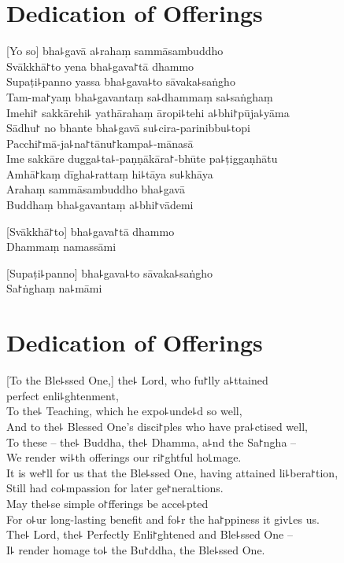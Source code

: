 
\chapter{Dedication of Offerings}%

[Yo so] bha꜕gavā a꜕rahaṃ sammāsambuddho\\
Svākkhā꜓to yena bha꜕gava꜓tā dhammo\\
Supaṭi꜕panno yassa bha꜕gava꜕to sāvaka꜕saṅgho\\
Tam-ma꜓yaṃ bha꜕gavantaṃ sa꜕dhammaṃ sa꜕saṅghaṃ\\
Imehi꜓ sakkārehi꜕ yathārahaṃ āropi꜕tehi a꜕bhi꜓pūja꜕yāma\\
Sādhu꜓ no bhante bha꜕gavā su꜕cira-parinibbu꜕topi\\
Pacchi꜓mā-ja꜕na꜓tānu꜓kampa꜕-mānasā\\
Ime sakkāre dugga꜕ta꜕-paṇṇākāra꜓-bhūte pa꜕ṭiggaṇhātu\\
Amhā꜓kaṃ dīgha꜕rattaṃ hi꜕tāya su꜕khāya\\
Arahaṃ sammāsambuddho bha꜕gavā\\
Buddhaṃ bha꜕gavantaṃ a꜕bhi꜓vādemi 

[Svākkhā꜓to] bha꜕gava꜓tā dhammo\\
Dhammaṃ namassāmi 

[Supaṭi꜕panno] bha꜕gava꜕to sāvaka꜕saṅgho\\
Sa꜓ṅghaṃ na꜕māmi 

\clearpage

\chapter{Dedication of Offerings}%

[To the Ble꜕ssed One,] the꜕ Lord, who fu꜓lly a꜕ttained\\
\vin perfect enli꜕ghtenment,\\
To the꜕ Teaching, which he expo꜕unde꜕d so well,\\
And to the꜕ Blessed One's disci꜓ples who have pra꜕ctised well,\\
To these -- the꜕ Buddha, the꜕ Dhamma, a꜕nd the Sa꜓ngha --\\
We render wi꜕th offerings our ri꜓ghtful ho꜖mage.\\
It is we꜓ll for us that the Ble꜕ssed One, having attained li꜕bera꜓tion,\\
Still had co꜕mpassion for later ge꜓nera꜖tions.\\
May the꜕se simple o꜓fferings be acce꜕pted\\
For o꜕ur long-lasting benefit and fo꜕r the ha꜓ppiness it giv꜖es us.\\
The꜕ Lord, the꜕ Perfectly Enli꜓ghtened and Ble꜕ssed One --\\
I꜕ render homage to꜕ the Bu꜓ddha, the Ble꜕ssed One. 

